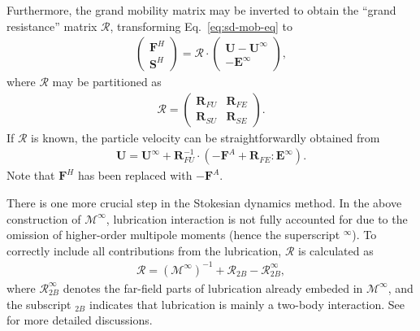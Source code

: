 Furthermore, the grand mobility matrix may be inverted to obtain the ``grand resistance'' matrix $\mathscr{R}$, transforming Eq.\ \eqref{eq:sd-mob-eq} to
\begin{equation} 
 \begin{aligned} \label{eq:sd-hydro}
  \begin{pmatrix}
   {\bm F}^H \\
   {\bm S}^H
  \end{pmatrix}
  = \mathscr{R} \cdot
  \begin{pmatrix}
   {\bm U}-{\bm U}^\infty \\
   -{\bm E}^\infty
  \end{pmatrix},
 \end{aligned}
\end{equation}
where $\mathscr{R}$ may be partitioned as
\begin{equation} 
 \begin{aligned}
  \mathscr{R} =
  \begin{pmatrix}
   {\bm R}_{FU} & {\bm R}_{FE} \\
   {\bm R}_{SU} & {\bm R}_{SE}
  \end{pmatrix}.
 \end{aligned}
\end{equation} 
If $\mathscr{R}$ is known, the particle velocity can be straightforwardly obtained from
\begin{equation} \label{eq:sd-vel}
 \begin{aligned}
  \bm{U} =  \bm{U}^\infty + \bm{R}_{FU}^{-1} \cdot(-\bm{F}^A +\bm{R}_{FE}:\bm{E}^\infty).
 \end{aligned}
\end{equation}
Note that $\bm{F}^H$ has been replaced with $-\bm{F}^A$.

There is one more crucial step in the Stokesian dynamics method.
In the above construction of $\mathscr{M}^\infty$, lubrication interaction is not fully accounted for due to the omission of higher-order multipole moments (hence the superscript $^\infty$). To correctly include all contributions from the lubrication, $\mathscr{R}$ is calculated as
\begin{equation} \label{eq:sd-lub-correction}
 \begin{aligned}
  \mathscr{R} = (\mathscr{M}^\infty)^{-1} +\mathscr{R}_{2B} - \mathscr{R}_{2B}^\infty,
 \end{aligned}
\end{equation}
where $\mathscr{R}_{2B}^\infty$ denotes the far-field parts of lubrication already embeded in $\mathscr{M}^\infty$, and the subscript $_{2B}$ indicates that lubrication is mainly a two-body interaction. See \cite{durlofsky_brady_bossis_1987, Brady_Bossis1988} for more detailed discussions.  

